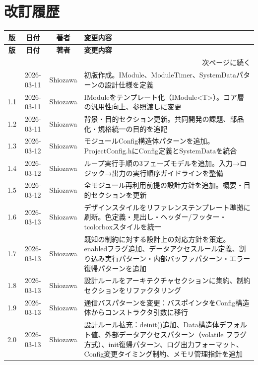 \section*{改訂履歴}

\begin{longtable}{c c c p{}}
\toprule
\textbf{版} & \textbf{日付} & \textbf{著者} & \textbf{変更内容} \\
\midrule
\endfirsthead
\toprule
\textbf{版} & \textbf{日付} & \textbf{著者} & \textbf{変更内容} \\
\midrule
\endhead
\midrule
\multicolumn{4}{r}{\small 次ページに続く} \\
\endfoot
\bottomrule
\endlastfoot
1.0 & 2026-03-11 & Shiozawa & 初版作成。IModule、ModuleTimer、SystemDataパターンの設計仕様を定義 \\
1.1 & 2026-03-11 & Shiozawa & IModuleをテンプレート化（IModule<T>）。コア層の汎用性向上、参照渡しに変更 \\
1.2 & 2026-03-11 & Shiozawa & 背景・目的セクション更新。共同開発の課題、部品化・規格統一の目的を追記 \\
1.3 & 2026-03-12 & Shiozawa & モジュールConfig構造体パターンを追加。ProjectConfig.hにConfig定義とSystemDataを統合 \\
1.4 & 2026-03-12 & Shiozawa & ループ実行手順の3フェーズモデルを追加。入力→ロジック→出力の実行順序ガイドラインを整備 \\
1.5 & 2026-03-12 & Shiozawa & 全モジュール再利用前提の設計方針を追加。概要・目的セクションを更新 \\
1.6 & 2026-03-13 & Shiozawa & デザインスタイルをリファレンステンプレート準拠に刷新。色定義・見出し・ヘッダー/フッター・tcolorboxスタイルを統一 \\
1.7 & 2026-03-13 & Shiozawa & 既知の制約に対する設計上の対応方針を策定。enabledフラグ追加、データアクセスルール定義、割り込み実行パターン・内部バッファパターン・エラー復帰パターンを追加 \\
1.8 & 2026-03-13 & Shiozawa & 設計ルールをアーキテクチャセクションに集約、制約セクションをリファクタリング \\
1.9 & 2026-03-13 & Shiozawa & 通信バスパターンを変更：バスポインタをConfig構造体からコンストラクタ引数に移行 \\
2.0 & 2026-03-13 & Shiozawa & 設計ルール拡充：deinit()追加、Data構造体デフォルト値、外部データアクセスパターン（volatile フラグ方式）、init復帰パターン、ログ出力フォーマット、Config変更タイミング制約、メモリ管理指針を追加 \\

\end{longtable}
